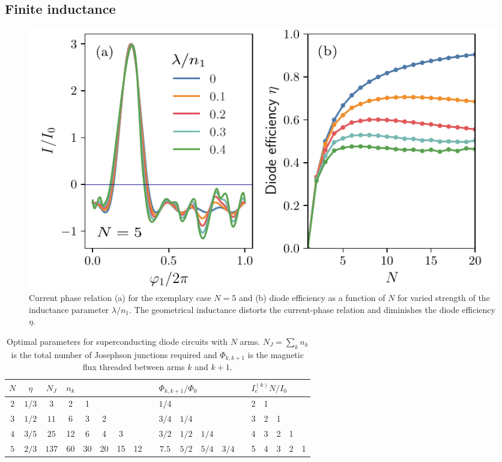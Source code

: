 \documentclass[aps,rsi,reprint,amsmath,amssymb,floatfix,longbibliography,superscriptaddress]{revtex4-1}
\begin{document}
\subsection{Finite inductance}

\begin{figure}[t]
	\centering
	\includegraphics[width=\columnwidth]{diode-inductance.pdf}
	\caption{Current phase relation (a) for the exemplary case $N=5$ and (b) diode efficiency as a function of $N$ for varied strength of the inductance parameter $\lambda/n_1$. The geometrical inductance distorts the current-phase relation and diminishes the diode efficiency $\eta$.}
	\label{fig:inductance}
\end{figure}

\begin{table}[t]
\centering
\begin{tabular}{c | c | c | c c c c c c | c c c c c | c c c c c} 
 \hline
 $N$ & $\eta$ & $N_J $ & $n_k$ & & & & & & \multicolumn{4}{l}{$\Phi_{k,k+1}/\Phi_0$} 
 &&\multicolumn{4}{l}{$I_c^{(k)}N/I_0$}
 \\
 \hline
$2$ & $1/3$ & $3$ & 2 & 1 & & & & &$1/4$ & & & & 
&2&1&&
\\
$3$ & $1/2$ & $11$ & 6 & 3 &2 & & & &$3/4$&  $1/4$ & & & 
&3&2&1&\\
$4$ & $3/5$ & $25$ & 12 & 6 & 4 & 3 & && $3/2$&  $1/2$ & $1/4$ & &
&4&3&2&1\\
$5$ & $2/3$ & $137$ & 60 & 30 & 20 & 15 & 12 && $7.5$&  $5/2$ & $5/4$ & $3/4$&
&5&4&3&2&1\\
\end{tabular}
\caption{Optimal parameters for superconducting diode circuits with $N$ arms. $N_J=\sum_k n_k$ is the total number of Josephson junctions required and $\Phi_{k,k+1}$ is the magnetic flux threaded between arms $k$ and $k+1$.}
\label{tab:params}
\end{table}
\end{document}
